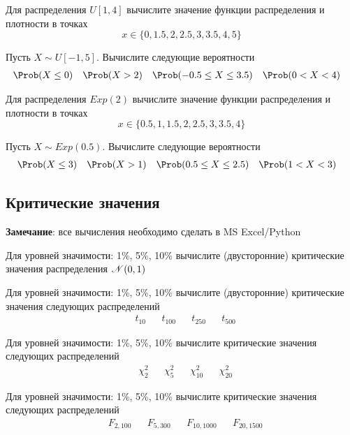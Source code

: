 \begin{exercise}
Для распределения \(U[1, 4]\) 
вычислите значение функции распределения и плотности в точках
\[
	x\in\{0, 1.5, 2, 2.5, 3, 3.5, 4, 5\}
\]
\end{exercise}

\begin{exercise}
Пусть \(X\sim U[-1, 5]\). Вычислите следующие вероятности
\begin{align*}
	&\Prob(X\leq0) & &\Prob(X>2) & 
	&\Prob(-0.5\leq X\leq3.5) & &\Prob(0<X<4)
\end{align*}
\end{exercise}

\begin{exercise}
Для распределения \(Exp(2)\) 
вычислите значение функции распределения и плотности в точках
\[
	x\in\{0.5, 1, 1.5, 2, 2.5, 3, 3.5, 4\}
\]
\end{exercise}

\begin{exercise}
Пусть \(X\sim Exp(0.5)\). Вычислите следующие вероятности
\begin{align*}
	&\Prob(X\leq3) & &\Prob(X>1) & 
	&\Prob(0.5\leq X\leq2.5) & &\Prob(1<X<3)
\end{align*}
\end{exercise}

\subsection{Критические значения}

\textbf{Замечание}: все вычисления необходимо сделать в MS Excel/Python

\begin{exercise}
Для уровней значимости: 1\%, 5\%, 10\% вычислите (двусторонние) 
критические значения распределения \({\mathscr N}(0,1)\)
\end{exercise}

\begin{exercise}
Для уровней значимости: 1\%, 5\%, 10\% вычислите (двусторонние) 
критические значения следующих распределений
\begin{align*}
	&t_{10} & &t_{100} & &t_{250} & &t_{500}
\end{align*}
\end{exercise}

\begin{exercise}
Для уровней значимости: 1\%, 5\%, 10\% вычислите
критические значения следующих распределений
\begin{align*}
	&\chi^2_{2} & &\chi^2_{5} & &\chi^2_{10} & &\chi^2_{20}
\end{align*}
\end{exercise}

\begin{exercise}
Для уровней значимости: 1\%, 5\%, 10\% вычислите
критические значения следующих распределений
\begin{align*}
	&F_{2,100} & &F_{5, 300} & &F_{10, 1000} & &F_{20, 1500}
\end{align*}
\end{exercise}